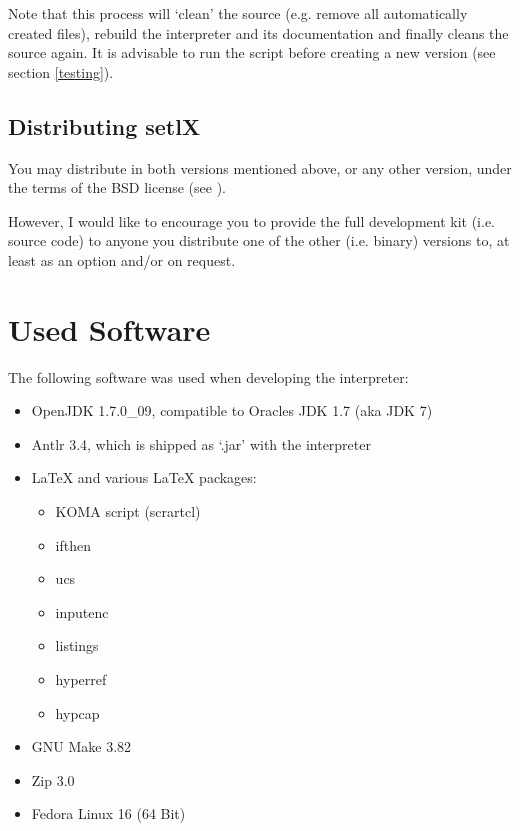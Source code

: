 Note that this process will `clean' the source (e.g. remove all automatically created files), rebuild the interpreter and its documentation and finally cleans the source again. It is advisable to run the  script before creating a new version (see section \ref{testing}).

\subsection{Distributing setlX}

You may distribute \setlX{} in both versions mentioned above, or any other version, under the terms of the BSD license (see ).

However, I would like to encourage you to provide the full development kit (i.e. source code) to anyone you distribute one of the other (i.e. binary) versions to, at least as an option and\slash{}or on request.

\section{Used Software}

The following software was used when developing the \setlX{} interpreter:

\begin{itemize}
	\item OpenJDK 1.7.0\_09, compatible to Oracles JDK 1.7 (aka JDK 7)
	\item Antlr 3.4, which is shipped as `.jar' with the interpreter
	\item \LaTeX{} and various \LaTeX{} packages:
		\begin{itemize}
			\item KOMA script (scrartcl)
			\item ifthen
			\item ucs
			\item inputenc
			\item listings
			\item hyperref
			\item hypcap
		\end{itemize}
	\item GNU Make 3.82
	\item Zip 3.0
	\item Fedora Linux 16 (64 Bit)
\end{itemize}


